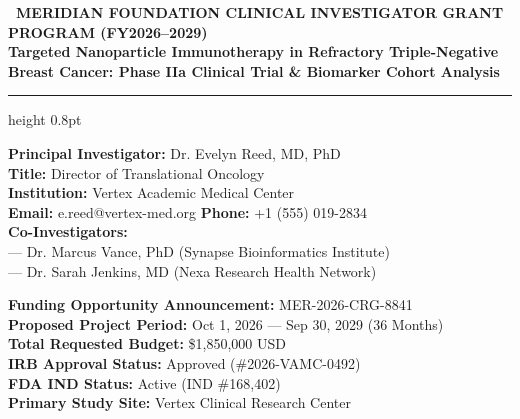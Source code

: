 \documentclass[10pt,a4paper]{article}
\begin{document}
\begin{tcolorbox}[grantbox]
\begin{center}
  {\small \color{SecondaryTeal}\textbf{\faFlask\ MERIDIAN FOUNDATION CLINICAL INVESTIGATOR GRANT PROGRAM (FY2026--2029)}} \\[0.2em]
  {\Large \color{PrimaryNavy}\textbf{Targeted Nanoparticle Immunotherapy in Refractory Triple-Negative Breast Cancer: Phase IIa Clinical Trial \& Biomarker Cohort Analysis}} \\[0.3em]
  \color{BorderGray}\hrule height 0.8pt \vspace{0.3em}
\end{center}

\begin{minipage}[t]{0.48\textwidth}
  \small
  \textbf{\color{PrimaryNavy}Principal Investigator:} Dr. Evelyn Reed, MD, PhD \\
  \textbf{Title:} Director of Translational Oncology \\
  \textbf{Institution:} Vertex Academic Medical Center \\
  \textbf{Email:} e.reed@vertex-med.org \quad \textbf{Phone:} +1 (555) 019-2834 \\[0.2em]
  \textbf{\color{PrimaryNavy}Co-Investigators:} \\
  --- Dr. Marcus Vance, PhD (Synapse Bioinformatics Institute) \\
  --- Dr. Sarah Jenkins, MD (Nexa Research Health Network)
\end{minipage}%
\hfill
\begin{minipage}[t]{0.48\textwidth}
  \small
  \textbf{\color{PrimaryNavy}Funding Opportunity Announcement:} MER-2026-CRG-8841 \\
  \textbf{\color{PrimaryNavy}Proposed Project Period:} Oct 1, 2026 --- Sep 30, 2029 (36 Months) \\
  \textbf{\color{PrimaryNavy}Total Requested Budget:} \$1,850,000 USD \\
  \textbf{\color{PrimaryNavy}IRB Approval Status:} Approved (\#2026-VAMC-0492) \\
  \textbf{\color{PrimaryNavy}FDA IND Status:} Active (IND \#168,402) \\
  \textbf{\color{PrimaryNavy}Primary Study Site:} Vertex Clinical Research Center
\end{minipage}
\end{tcolorbox}
\end{document}
